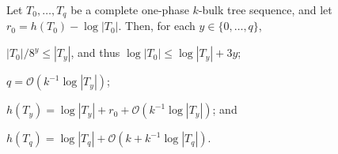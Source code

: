 \documentclass[kpfonts]{patmorin}
\newcommand{\Oh}{\mathcal{O}}
\let\le\leqslant
\begin{document}
\begin{lem}
Let $T_0,\ldots,T_{q}$ be a complete one-phase $k$-bulk tree sequence, and let $r_0=h(T_0)-\log|T_0|$.  Then, for each $y\in\{0,\ldots,q\}$,
\begin{compactenum}[(i)]
\item $ |T_0|/8^y\le |T_y|$, and thus $\log|T_0| \le \log|T_y| + 3y$;\label{height-diff}
  \item $q=\Oh(k^{-1}\log|T_y|)$; \label{ystar-bound}
    \item $h(T_y)= \log|T_y| + r_0+\Oh(k^{-1}\log|T_y|) $; and
    \label{bulktree-height-item-i}
    \item $h(T_{q}) = \log|T_{q}|+\Oh(k+k^{-1}\log|T_{q}|)$.\label{bulktree-height-item-ii}
  \end{compactenum}
\end{lem}
\end{document}
